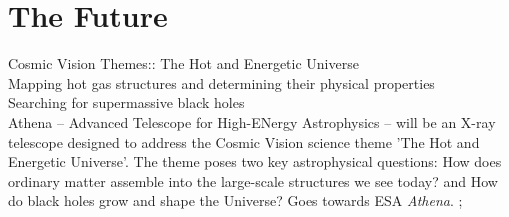 \documentclass[oneside, a4paper, onecolumn, 11pt]{article}
\begin{document}
{\section{The Future}
Cosmic Vision Themes:: The Hot and Energetic Universe \\
Mapping hot gas structures and determining their physical properties \\
Searching for supermassive black holes \\ 
Athena – Advanced Telescope for High-ENergy Astrophysics – will be an X-ray telescope designed to address the Cosmic Vision science theme 'The Hot and Energetic Universe'. The theme poses two key astrophysical questions:
How does ordinary matter assemble into the large-scale structures we see today? and
How do black holes grow and shape the Universe?
Goes towards ESA {\it Athena}. ; 




}
\end{document}
